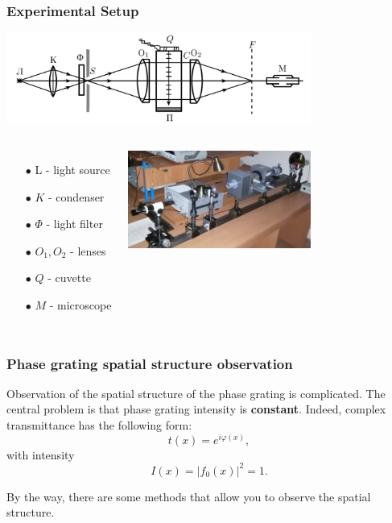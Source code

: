\documentclass{beamer}
\begin{document}
	\begin{frame}
		\frametitle{Experimental Setup}
		\includegraphics[width=10cm]{res/setup.png}
		
 		\begin{columns}
			\begin{enumerate}
				\item[$\bullet$] L - light source
				\item[$\bullet$] $K$ - condenser
				\item[$\bullet$] $\Phi$ - light filter
				\item[$\bullet$] $O_1, O_2$ - lenses
				\item[$\bullet$] $Q$ - cuvette
				\item[$\bullet$] $M$ - microscope
			\end{enumerate}
			\includegraphics[width=6cm]{res/real_setup.png}
		\end{columns}
	\end{frame}

	\begin{frame}
		\frametitle{Phase grating spatial structure observation}
		
				Observation of the spatial structure of the phase grating is complicated. The central problem is that phase grating intensity is \textbf{constant}. Indeed, complex transmittance has the following form:
				$$t(x) = e^{i\varphi(x)},$$ with intensity
				$$I(x) = |f_0(x)|^2 = 1.$$
				
				By the way, there are some methods that allow you to observe the spatial structure.

	\end{frame}
\end{document}
